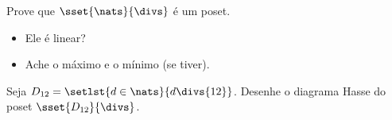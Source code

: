 \begin{exercise}
	Prove que $\sset {\nats} {\divs}$ é um poset.
	\begin{itemize}[--]
		\item Ele é linear?
		\item Ache o máximo e o mínimo (se tiver).
	\end{itemize}
\end{exercise}

\begin{exercise}
	Seja $D_{12} = \setlst {d\in\nats} {d\divs{12}}$. Desenhe o diagrama Hasse do poset $\sset {D_{12}} {\divs}$.
\end{exercise}
